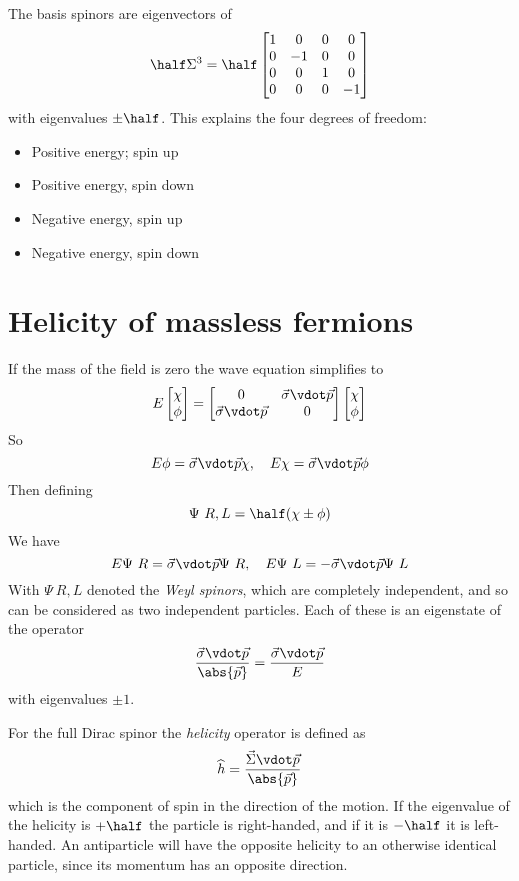 The basis spinors are eigenvectors of 
\[ \half \Sigma^3 = \half
\begin{bmatrix}
  1&0&0&0\\0&-1&0&0\\0&0&1&0\\0&0&0&-1
\end{bmatrix}
\]
with eigenvalues $\pm\half$.
This explains the four degrees of freedom:
\begin{itemize}
\item Positive energy; spin up
\item Positive energy, spin down
\item Negative energy, spin up
\item Negative energy, spin down
\end{itemize}

\section{Helicity of massless fermions}
\label{sec:helic-massl-ferm}

If the mass of the field is zero the wave equation simplifies to
\[ E
\begin{bmatrix}
  \chi \\ \phi
\end{bmatrix}
= 
\begin{bmatrix}
  0 & \vec{\sigma} \vdot \vec{p} \\ \vec{\sigma} \vdot \vec{p} & 0
\end{bmatrix}
\begin{bmatrix}
  \chi \\ \phi
\end{bmatrix}
\]
So
\[ E \phi = \vec{\sigma} \vdot \vec{p} \chi, \quad E \chi = \vec{\sigma} \vdot \vec{p} \phi \]
Then defining 
\[ \Psi~{{R,L}} = \half (\chi\pm\phi) \]
We have
\[ E \Psi~R = \vec{\sigma} \vdot \vec{p} \Psi~R, \quad E \Psi~L = -
\vec{\sigma} \vdot \vec{p} \Psi~L \] With $\Psi~{R,L}$ denoted the
\emph{Weyl spinors}, which are completely independent, and so can be
considered as two independent particles. Each of these is an eigenstate of the operator
\[ \frac{\vec{\sigma} \vdot \vec{p}}{\abs{\vec{p}}} = \frac{\vec{\sigma} \vdot \vec{p}}{E} \] with eigenvalues $\pm 1$.

For the full Dirac spinor the \emph{helicity} operator is defined as
\begin{equation}
  \label{eq:96}
  \Op{h} = \frac{\vec{\Sigma} \vdot \vec{p}}{\abs{\vec{p}}}
\end{equation}
which is the component of spin in the direction of the motion.  If the
eigenvalue of the helicity is $+\half$ the particle is right-handed,
and if it is $-\half$ it is left-handed. An antiparticle will have the
opposite helicity to an otherwise identical particle, since its
momentum has an opposite direction.

